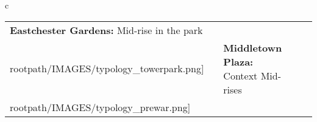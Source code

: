\begin{table}[H]
        \begin{tabular}{c}
        \begin{tabular}{m{1.25in} m{2in} m{.1in} m{1.25in} m{2in}}
\textbf{Eastchester Gardens:} {Mid-rise in the park} & \texttt{[image: \\rootpath/IMAGES/typology\_towerpark.png]} & & \textbf{Middletown Plaza:} {Context Mid-rises} & \texttt{[image: \\rootpath/IMAGES/typology\_prewar.png]}
\end{tabular}\end{tabular}
        \end{table}
